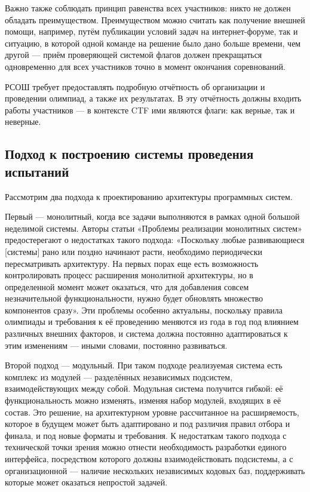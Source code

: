 Важно также соблюдать принцип равенства всех участников: никто не должен обладать преимуществом. Преимуществом можно считать как получение внешней помощи, например, путём публикации условий задач на интернет-форуме, так и ситуацию, в которой одной команде на решение было дано больше времени, чем другой — приём проверяющей системой флагов должен прекращаться одновременно для всех участников точно в момент окончания соревнований.

РСОШ требует предоставлять подробную отчётность об организации и проведении олимпиад, а также их результатах. В эту отчётность должны входить работы участников — в контексте CTF ими являются флаги: как верные, так и неверные.

\subsection{Подход к построению системы проведения испытаний}

Рассмотрим два подхода к проектированию архитектуры программных систем.

Первый — монолитный, когда все задачи выполняются в рамках одной большой неделимой системы. Авторы статьи «Проблемы реализации монолитных систем»\cite{Fomin21} предостерегают о недостатках такого подхода: «Поскольку любые развивающиеся [системы] рано или поздно начинают расти, необходимо периодически пересматривать архитектуру. На первых порах еще есть возможность контролировать процесс расширения монолитной архитектуры, но в определенной момент может оказаться, что для добавления совсем незначительной функциональности, нужно будет обновлять множество компонентов сразу». Эти проблемы особенно актуальны, поскольку правила олимпиады и требования к её проведению меняются из года в год под влиянием различных внешних факторов\cite{Olymp20}\cite{Olymp}, и система должна постоянно адаптироваться к этим изменениям — иными словами, постоянно развиваться.

Второй подход — модульный. При таком подходе реализуемая система есть комплекс из модулей — разделённых независимых подсистем, взаимодействующих между собой. Модульная система получится гибкой: её функциональность можно изменять, изменяя набор модулей, входящих в её состав. Это решение, на архитектурном уровне рассчитанное на расширяемость, которое в будущем может быть адаптировано и под различия правил отбора и финала, и под новые форматы и требования. К недостаткам такого подхода с технической точки зрения можно отнести необходимость разработки единого интерфейса, посредством которого должны взаимодействовать подсистемы\cite{Parnas85}, а с организационной — наличие нескольких независимых кодовых баз, поддерживать которые может оказаться непростой задачей\cite{Fomin21}.

